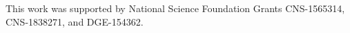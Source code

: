\documentclass[manuscript]{acmart}
\begin{document}
\begin{acks}
This work was supported by National Science Foundation Grants
CNS-1565314, CNS-1838271, and DGE-154362.
\end{acks}



\end{document}
